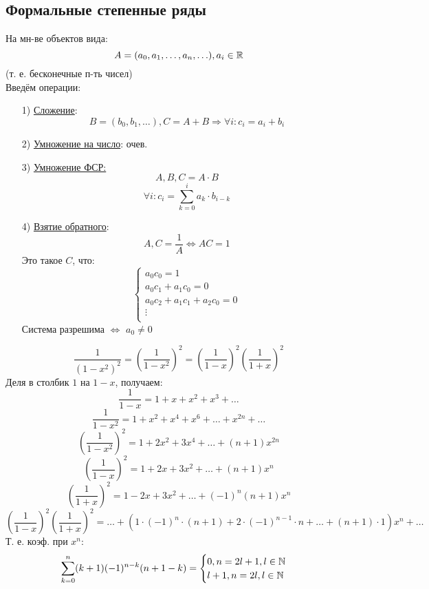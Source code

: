 \subsection{Формальные степенные ряды}
На мн-ве объектов вида:
\[
A = (a_0, a_1, \ldots, a_n, \ldots), a_i \in \mathbb{R}
\]
(т. е. бесконечные п-ть чисел) \\
Введём операции:
\begin{itemize}
  \item [1) ] \underline{Сложение}:
    \[
    B = (b_0, b_1, \ldots), C = A + B \Rightarrow \forall i \colon c_i = a_i + b_i
    \]
  \item [2) ] \underline{Умножение на число}: очев.
  \item [3) ] \underline{Умножение ФСР:}
    \[
    A, B, C = A\cdot B
    \]
    \[
    \forall i \colon c_i = \sum_{k = 0}^{i} a_k \cdot b_{i - k}
    \]
  \item [4) ] \underline{Взятие обратного}:
    \[
    A, C = \frac{1}{A} \iff AC = 1
    \]
    Это такое $C$, что:
    \[
    \begin{cases}
    a_0c_0 = 1 \\
    a_0c_1 + a_1c_0 = 0 \\
    a_0c_2 + a_1c_1 + a_2c_0 = 0 \\
    \vdots \\
    \end{cases}
    \]
    Система разрешима $\iff$ $a_0 \neq 0$
\end{itemize}

\begin{example}
  \[
  \frac{1}{(1 - x^{2})^{2}} = \left(\frac{1}{1 - x^{2}}\right)^{2} = \left(\frac{1}{1 - x}\right)^{2}\left(\frac{1}{1 + x}\right)^{2}
  \]
  Деля в столбик $1$ на $1 - x$, получаем:
  \[
  \frac{1}{1 - x} = 1 + x + x^{2} + x^{3} + \ldots
  \]
  \[
  \frac{1}{1 - x^{2}} = 1 + x^{2} + x^{4} + x^{6} + \ldots + x^{2n} + \ldots
  \]
  \[
  \left(\frac{1}{1 - x^{2}}\right)^{2} = 1 + 2x^{2} + 3x^{4} + \ldots + (n + 1)x^{2n}
  \]
  \[
  \left(\frac{1}{1-x}\right)^{2} = 1 + 2x + 3x^{2} + \ldots + (n + 1)x^{n}
  \]
  \[
  \left(\frac{1}{1+x}\right)^{2} = 1 - 2x + 3x^{2} + \ldots + (-1)^{n}(n + 1)x^{n}
  \]
  \[
  \left(\frac{1}{1 - x}\right)^{2}\left(\frac{1}{1 +x}\right)^{2} = \ldots + (1 \cdot (-1)^{n} \cdot (n + 1) + 2 \cdot (-1)^{n - 1} \cdot n + \ldots + (n + 1) \cdot 1) x^{n} + \ldots
  \]
  Т. е. коэф. при $x^{n}$:
  \[
  \sum_{k = 0}^{n} (k + 1) (-1)^{n - k} (n + 1 - k) = \begin{cases}
  0, n = 2l + 1, l \in \mathbb{N} \\
  l + 1, n = 2l, l \in \mathbb{N}
  \end{cases}
  \]
\end{example}
